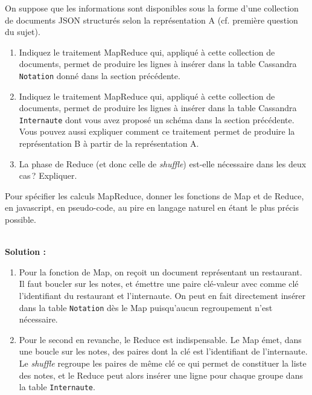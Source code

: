 \documentclass[10pt,a4paper]{article}
\newenvironment{solution}[0]{
~\\ \color{red} \textbf{Solution : }\color{black}}{%
}
\begin{document}
On suppose que les informations sont disponibles sous la
forme d'une collection de documents JSON structurés 
selon la représentation A (cf. première question du sujet).
     
\begin{enumerate}
  \item Indiquez
    le traitement MapReduce qui, appliqué à cette collection de documents,
    permet de produire les lignes à insérer dans la 
    table Cassandra \texttt{Notation}
    donné dans la section précédente. 

\item  Indiquez
    le traitement MapReduce qui, appliqué à cette collection de documents,
    permet de produire les lignes à insérer dans la 
    table Cassandra \texttt{Internaute} dont vous avez
    proposé un schéma dans la section précédente. Vous pouvez aussi 
    expliquer comment ce traitement permet de produire la  
    représentation B à partir de la représentation A.
   
   \item La phase de Reduce (et donc celle de \textit{shuffle}) 
   est-elle  nécessaire dans les deux cas\,? Expliquer.
\end{enumerate}

Pour spécifier les calculs MapReduce, donner les fonctions de Map et de Reduce, en javascript,
en pseudo-code, au pire en langage naturel en étant le plus précis possible.

\begin{solution}

\begin{enumerate}
  \item Pour la fonction de Map, on reçoit un document représentant un
     restaurant. Il faut boucler  sur les notes, et émettre 
     une paire clé-valeur avec comme clé l'identifiant du restaurant
     et l'internaute. On peut en fait directement insérer
     dans la table \texttt{Notation} dès le Map puisqu'aucun 
     regroupement n'est nécessaire.
  \item Pour le second en revanche, le Reduce est indispensable. Le Map 
  émet, dans une boucle sur les notes, des paires dont la clé est 
  l'identifiant de l'internaute. Le \textit{shuffle} regroupe 
  les paires de même clé ce qui permet de constituer la liste des notes, 
  et le Reduce peut alors insérer 
  une ligne pour chaque groupe dans la table \texttt{Internaute}. 
\end{enumerate}

\end{solution}
\end{document}
